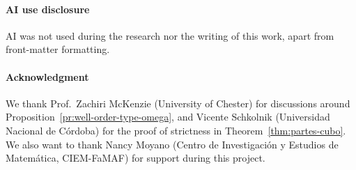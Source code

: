 
\paragraph*{AI use disclosure}
AI was not used during the research nor the writing of this work, apart from
front-matter formatting.

\paragraph*{Acknowledgment}
We thank Prof.~Zachiri McKenzie (University of Chester) for discussions around
Proposition~\ref{pr:well-order-type-omega}, and Vicente Schkolnik (Universidad
Nacional de Córdoba) for the proof of strictness in
Theorem~\ref{thm:partes-cubo}. We also want to thank Nancy Moyano (Centro de
Investigación y Estudios de Matemática, CIEM-FaMAF) for support during this
project.

